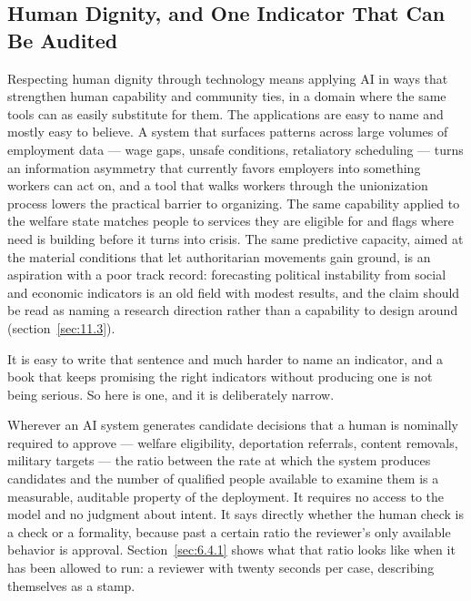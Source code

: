 \subsection{Human Dignity, and One Indicator That Can Be Audited}
\label{sec:5.1.4}
Respecting human dignity through technology means applying AI in ways that strengthen human capability and community ties, in a domain where the same tools can as easily substitute for them. The applications are easy to name and mostly easy to believe. A system that surfaces patterns across large volumes of employment data — wage gaps, unsafe conditions, retaliatory scheduling — turns an information asymmetry that currently favors employers into something workers can act on, and a tool that walks workers through the unionization process lowers the practical barrier to organizing. The same capability applied to the welfare state matches people to services they are eligible for and flags where need is building before it turns into crisis. The same predictive capacity, aimed at the material conditions that let authoritarian movements gain ground, is an aspiration with a poor track record: forecasting political instability from social and economic indicators is an old field with modest results, and the claim should be read as naming a research direction rather than a capability to design around (section~\ref{sec:11.3}).

It is easy to write that sentence and much harder to name an indicator, and a book that keeps promising the right indicators without producing one is not being serious. So here is one, and it is deliberately narrow.

Wherever an AI system generates candidate decisions that a human is nominally required to approve — welfare eligibility, deportation referrals, content removals, military targets — the ratio between the rate at which the system produces candidates and the number of qualified people available to examine them is a measurable, auditable property of the deployment. It requires no access to the model and no judgment about intent. It says directly whether the human check is a check or a formality, because past a certain ratio the reviewer's only available behavior is approval. Section~\ref{sec:6.4.1} shows what that ratio looks like when it has been allowed to run: a reviewer with twenty seconds per case, describing themselves as a stamp.

